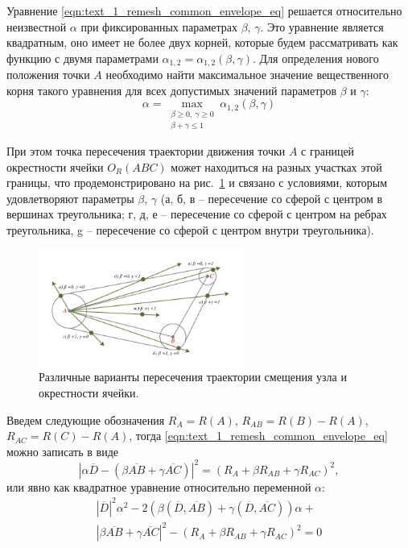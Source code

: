 Уравнение \eqref{eqn:text_1_remesh_common_envelope_eq} решается относительно неизвестной $\alpha$ при фиксированных параметрах $\beta$, $\gamma$.
Это уравнение является квадратным, оно имеет не более двух корней, которые будем рассматривать как функцию с двумя параметрами $\alpha_{1,2} = \alpha_{1,2}(\beta,\gamma)$.
Для определения нового положения точки $A$ необходимо найти максимальное значение вещественного корня такого уравнения для всех допустимых значений параметров $\beta$ и $\gamma$:
\begin{equation}
\alpha = \max_{\substack{\beta \ge 0, \ \gamma \ge 0 \\ \beta + \gamma \le 1}}{\alpha_{1,2}(\beta, \gamma)}
\end{equation}

При этом точка пересечения траектории движения точки $A$ с границей окрестности ячейки $O_R(ABC)$ может находиться на разных участках этой границы, что продемонстрировано на рис.~\ref{fig:text_1_remesh_common_envelope_2} и связано с условиями, которым удовлетворяют параметры $\beta$, $\gamma$ (а, б, в -- пересечение со сферой с центром в вершинах треугольника; г, д, е -- пересечение со сферой с центром на ребрах треугольника, g -- пересечение со сферой с центром внутри треугольника).

\begin{figure}[ht]
\centering
\includegraphics[width=0.6\textwidth]{fig/3dr_triangle2.pdf}
\singlespacing
{}\caption{Различные варианты пересечения траектории смещения узла и окрестности ячейки.}
\label{fig:text_1_remesh_common_envelope_2}
\end{figure}

Введем следующие обозначения $R_A = R(A)$, $R_{AB} = R(B) - R(A)$, $R_{AC} = R(C) - R(A)$, тогда \eqref{eqn:text_1_remesh_common_envelope_eq} можно записать в виде
\begin{equation}
	|\alpha \overline{D} - (\beta \overline{AB} + \gamma \overline{AC})|^2 = (R_A + \beta R_{AB} + \gamma R_{AC})^2,
\end{equation}
или явно как квадратное уравнение относительно переменной $\alpha$:
\begin{multline}
	|\overline{D}|^2 \alpha^2 - 2(\beta (\overline{D}, \overline{AB}) + \gamma (\overline{D}, \overline{AC})) \alpha + \\
	|\beta \overline{AB} + \gamma \overline{AC}|^2 - (R_A + \beta R_{AB} + \gamma R_{AC})^2 = 0
\end{multline}

